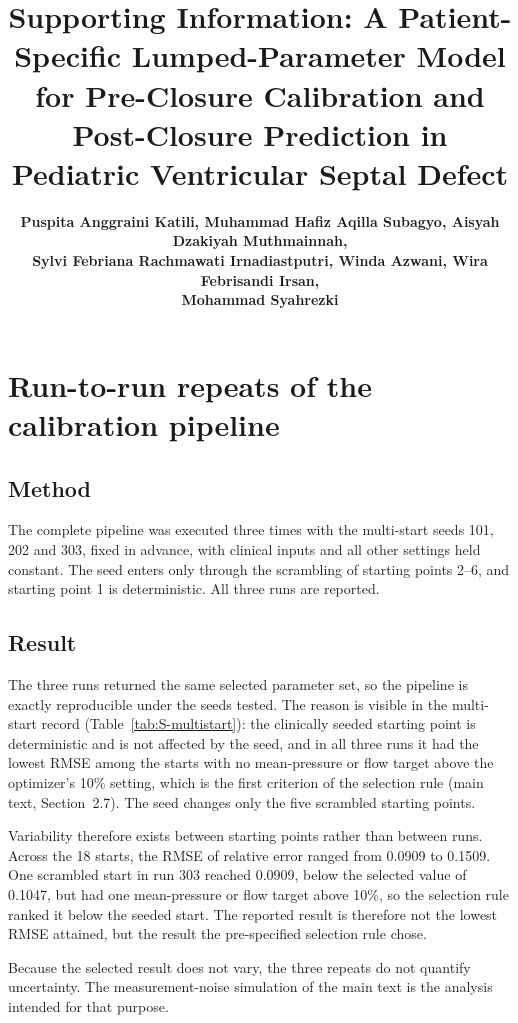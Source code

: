 \documentclass{article}
\title{Supporting Information: A Patient-Specific Lumped-Parameter Model for Pre-Closure Calibration and Post-Closure Prediction in Pediatric Ventricular Septal Defect}
\author{\textbf{Puspita Anggraini Katili, Muhammad Hafiz Aqilla Subagyo, Aisyah Dzakiyah Muthmainnah,}\\
  \textbf{Sylvi Febriana Rachmawati Irnadiastputri, Winda Azwani, Wira Febrisandi Irsan,}\\
  \textbf{Mohammad Syahrezki}}
\begin{document}
\maketitle

\section{Run-to-run repeats of the calibration pipeline}
\label{sec:S-repeats}

\subsection{Method}
The complete pipeline was executed three times with the multi-start seeds 101, 202 and 303, fixed in advance, with clinical inputs and all other settings held constant. The seed enters only through the scrambling of starting points 2--6, and starting point 1 is deterministic. All three runs are reported.

\subsection{Result}
The three runs returned the same selected parameter set, so the pipeline is exactly reproducible under the seeds tested. The reason is visible in the multi-start record (Table~\ref{tab:S-multistart}): the clinically seeded starting point is deterministic and is not affected by the seed, and in all three runs it had the lowest RMSE among the starts with no mean-pressure or flow target above the optimizer's 10\% setting, which is the first criterion of the selection rule (main text, Section~2.7). The seed changes only the five scrambled starting points.

Variability therefore exists between starting points rather than between runs. Across the 18 starts, the RMSE of relative error ranged from 0.0909 to 0.1509. One scrambled start in run 303 reached 0.0909, below the selected value of 0.1047, but had one mean-pressure or flow target above 10\%, so the selection rule ranked it below the seeded start. The reported result is therefore not the lowest RMSE attained, but the result the pre-specified selection rule chose.

Because the selected result does not vary, the three repeats do not quantify uncertainty. The measurement-noise simulation of the main text is the analysis intended for that purpose.
\end{document}
